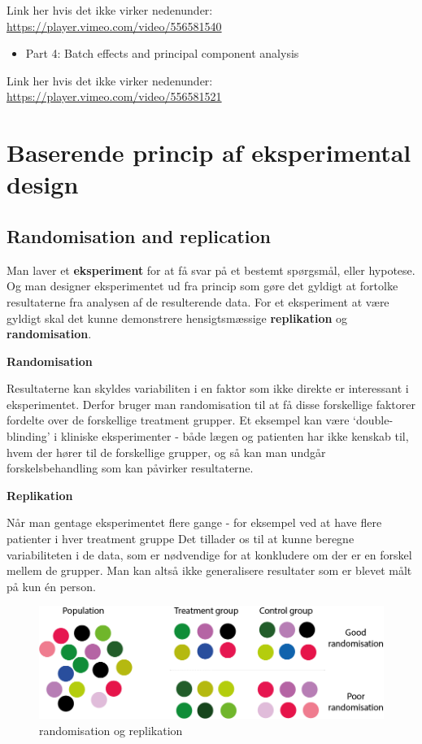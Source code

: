 \documentclass[
]{book}
\providecommand{\tightlist}{%
  \setlength{\itemsep}{0pt}\setlength{\parskip}{0pt}}
\begin{document}
Link her hvis det ikke virker nedenunder: \url{https://player.vimeo.com/video/556581540}

\begin{itemize}
\tightlist
\item
  Part 4: Batch effects and principal component analysis
\end{itemize}

Link her hvis det ikke virker nedenunder: \url{https://player.vimeo.com/video/556581521}

\hypertarget{baserende-princip-af-eksperimental-design}{%
\section{Baserende princip af eksperimental design}\label{baserende-princip-af-eksperimental-design}}

\hypertarget{randomisation-and-replication}{%
\subsection{Randomisation and replication}\label{randomisation-and-replication}}

Man laver et \textbf{eksperiment} for at få svar på et bestemt spørgsmål, eller hypotese. Og man designer eksperimentet ud fra princip som gøre det gyldigt at fortolke resultaterne fra analysen af de resulterende data. For et eksperiment at være gyldigt skal det kunne demonstrere hensigtsmæssige \textbf{replikation} og \textbf{randomisation}.

\textbf{Randomisation}

Resultaterne kan skyldes variabiliten i en faktor som ikke direkte er interessant i eksperimentet. Derfor bruger man randomisation til at få disse forskellige faktorer fordelte over de forskellige treatment grupper. Et eksempel kan være `double-blinding' i kliniske eksperimenter - både lægen og patienten har ikke kenskab til, hvem der hører til de forskellige grupper, og så kan man undgår forskelsbehandling som kan påvirker resultaterne.

\textbf{Replikation}

Når man gentage eksperimentet flere gange - for eksempel ved at have flere patienter i hver treatment gruppe Det tillader os til at kunne beregne variabiliteten i de data, som er nødvendige for at konkludere om der er en forskel mellem de grupper. Man kan altså ikke generalisere resultater som er blevet målt på kun én person.

\begin{figure}
\includegraphics[width=1\linewidth]{plots/randomisation} \caption{randomisation og replikation}\label{fig:unnamed-chunk-501}
\end{figure}
\end{document}
